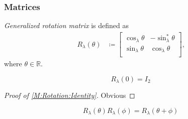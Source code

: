 \documentclass[../methodology.tex]{subfiles}
\begin{document}
\subsubsection{Matrices}
\begin{definition}\label{M:Rotation}
    \textit{Generalized rotation matrix} is defined as
    \begin{align*}
        R_\lambda\left(\theta\right) & \coloneqq
        \begin{bmatrix}
            \cos_\lambda{\theta} & -\sin_\lambda^\ast{\theta} \\
            \sin_\lambda{\theta} & \cos_\lambda{\theta}       \\
        \end{bmatrix}\text{,}
    \end{align*}
    where \(\theta\in\mathbb{R}\).
\end{definition}
\begin{corollary}\label{M:Rotation:Identity}
    \[
        R_\lambda\left(0\right)
        =
        I_2
    \]
\end{corollary}
\begin{proof}[Proof of \cref{M:Rotation:Identity}]
    Obvious
\end{proof}
\begin{corollary}\label{M:Rotation:Sum}
    \[
        R_\lambda\left(\theta\right)R_\lambda\left(\phi\right)=R_\lambda\left(\theta+\phi\right)
    \]
\end{corollary}
\end{document}
